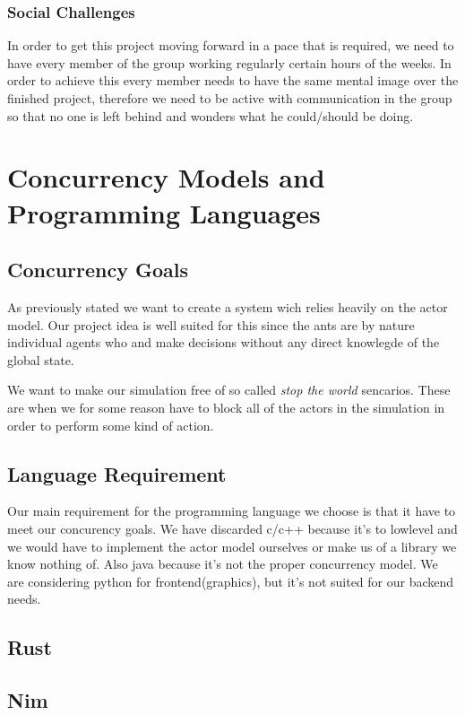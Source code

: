 \documentclass[a4paper]{article}
\begin{document}
\subsubsection{Social Challenges}
In order to get this project moving forward in a pace that is required, we need
to have every member of the group working regularly certain hours of the weeks.
In order to achieve this every member needs to have the same mental image over
the finished project, therefore we need to be active with communication in the
group so that no one is left behind and wonders what he could/should be doing.

\section{Concurrency Models and Programming Languages}

\subsection{Concurrency Goals}
As previously stated we want to create a system wich relies heavily on the actor
model. Our project idea is well suited for this since the ants are by nature
individual agents who and make decisions without any direct knowlegde of the
global state.

We want to make our simulation free of so called \emph{stop the world}
sencarios. These are when we for some reason have to block all of the actors in
the simulation in order to perform some kind of action.

\subsection{Language Requirement}
Our main requirement for the programming language we choose is that it have to meet our concurency goals.
We have discarded c/c++ because it's to lowlevel and we would have to implement the actor model ourselves or make us of a library we know nothing of. 
Also java because it's not the proper concurrency model. We are considering python for frontend(graphics),
but it's not suited for our backend needs.

\subsection{Rust}

\subsection{Nim}
\end{document}
